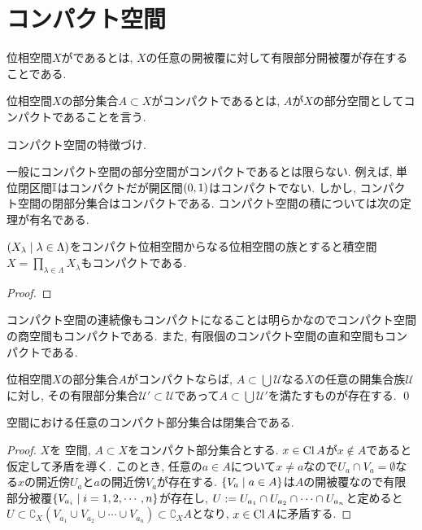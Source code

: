 \documentclass[uplatex, dvipdfmx, a4paper, 12pt, class=jsbook, crop=false]{standalone}
\begin{document}
\section{コンパクト空間}
\label{sec:compact-spaces}

\begin{definition}
	位相空間$ X $がであるとは, $ X $の任意の開被覆に対して有限部分開被覆が存在することである.
\end{definition}

位相空間$ X $の部分集合$ A \subset X $がコンパクトであるとは, $ A $が$ X $の部分空間としてコンパクトであることを言う.

\begin{proposition}
	コンパクト空間の特徴づけ\WIP.
\end{proposition}

一般にコンパクト空間の部分空間がコンパクトであるとは限らない.
例えば, 単位閉区間$ \mathbb{I} $はコンパクトだが開区間$ \left( 0 , 1 \right) $はコンパクトでない.
しかし, コンパクト空間の閉部分集合はコンパクトである. コンパクト空間の積については次の定理が有名である.

\begin{theorem}[\Tychonoff]
	\label{Tychonoff's theorem}
	$ \setfamily{X_\lambda}{\lambda \in \Lambda} $をコンパクト位相空間からなる位相空間の族とすると積空間$ X = \prod_{\lambda \in \Lambda} X_\lambda $もコンパクトである.
\end{theorem}

\begin{proof}
	\WIP
\end{proof}

コンパクト空間の連続像もコンパクトになることは明らかなのでコンパクト空間の商空間もコンパクトである.
また, 有限個のコンパクト空間の直和空間もコンパクトである.

\begin{proposition}
	位相空間$ X $の部分集合$ A $がコンパクトならば, $ A \subset \bigcup \mathscr{U} $なる$ X $の任意の開集合族$ \mathscr{U} $に対し, その有限部分集合$ \mathscr{U}' \subset \mathscr{U} $であって$ A \subset \bigcup \mathscr{U}' $を満たすものが存在する.
	\qed
\end{proposition}


\begin{proposition}
	\Hausdorff 空間における任意のコンパクト部分集合は閉集合である.
\end{proposition}
\begin{proof}
	$ X $を \Hausdorff 空間, $ A \subset X $をコンパクト部分集合とする.
	$ x \in \mathop{\mathrm{Cl}}\nolimits A $が$ x \notin A $であると仮定して矛盾を導く.
	このとき, 任意の$ a \in A $について$ x \neq a $なので$ U_a \cap V_a = \emptyset $なる$ x $の開近傍$ U_a $と$ a $の開近傍$ V_a $が存在する.
	$ \setcomp{V_a}{a \in A} $は$ A $の開被覆なので有限部分被覆$ \setcomp{V_{a_i}}{i=1, 2,\cdots, n} $が存在し, $ U \mathrel{:=} U_{a_1} \cap U_{a_2} \cap \cdots \cap U_{a_n} $と定めると$ U \subset \complement_X (V_{a_1} \cup V_{a_2} \cup \cdots \cup V_{a_n}) \subset \complement_X A $となり, $ x \in \mathop{\mathrm{Cl}}\nolimits A $に矛盾する.
\end{proof}
\end{document}
